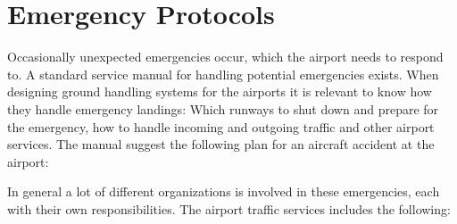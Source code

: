 \section{Emergency Protocols}

Occasionally unexpected emergencies occur, which the airport needs to respond to. A standard service manual for handling potential emergencies exists. When designing ground handling systems for the airports it is relevant to know how they handle emergency landings: Which runways to shut down and prepare for the emergency, how to handle incoming and outgoing traffic and other airport services.
The manual suggest the following plan for an aircraft accident at the airport:


In general a lot of different organizations is involved in these emergencies, each with their own responsibilities. The airport traffic services includes the following:

